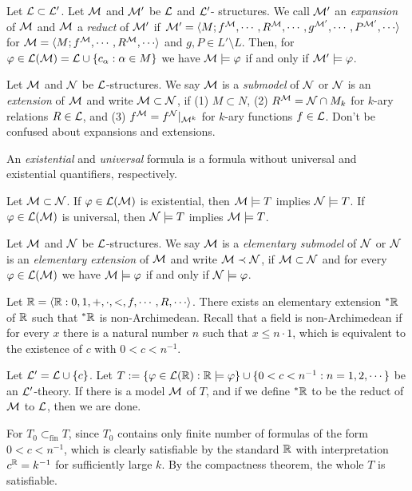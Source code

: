 \documentclass{../../../small}
\begin{document}
Let $\mathcal{L}\subset\mathcal{L}'$.
Let $\mathcal{M}$ and $\mathcal{M}'$ be $\mathcal{L}$ and $\mathcal{L}'$- structures.
We call $\mathcal{M}'$ an \emph{expansion} of $\mathcal{M}$ and $\mathcal{M}$ a \emph{reduct} of $\mathcal{M}'$ if $\cM'=\<M;f^\cM,\cdots,R^\cM,\cdots,g^{\cM'},\cdots,P^{\cM'},\cdots\>$ for $\cM=\<M;f^\cM,\cdots,R^\cM,\cdots\>$ and $g,P\in L'\setminus L$.
Then, for $\varphi\in\mathcal{L}(\mathcal{M})=\mathcal{L}\cup\{c_\alpha:\alpha\in M\}$ we have $\mathcal{M}\models\varphi$ if and only if $\mathcal{M}'\models\varphi$.

Let $\mathcal{M}$ and $\mathcal{N}$ be $\mathcal{L}$-structures.
We say $\mathcal{M}$ is a \emph{submodel} of $\mathcal{N}$ or $\mathcal{N}$ is an \emph{extension} of $\mathcal{M}$ and write $\mathcal{M}\subset\mathcal{N}$, if (1) $M\subset N$, (2) $R^{\mathcal{M}}=\mathcal{N}\cap M_k$ for $k$-ary relations $R\in\mathcal{L}$, and (3) $f^{\mathcal{M}}=f^{\mathcal{N}}|_{\mathcal{M}^k}$ for $k$-ary functions $f\in\mathcal{L}$.
Don't be confused about expansions and extensions.

\begin{defn*}
An \emph{existential} and \emph{universal} formula is a formula without universal and existential quantifiers, respectively.
\end{defn*}
\begin{prop*}
Let $\mathcal{M}\subset\mathcal{N}$.
If $\varphi\in\mathcal{L}(\mathcal{M})$ is existential, then $\mathcal{M}\models T$ implies $\mathcal{N}\models T$.
If $\varphi\in\mathcal{L}(\mathcal{M})$ is universal, then $\mathcal{N}\models T$ implies $\mathcal{M}\models T$.
\end{prop*}
\begin{defn*}
Let $\mathcal{M}$ and $\mathcal{N}$ be $\mathcal{L}$-structures.
We say $\mathcal{M}$ is a \emph{elementary submodel} of $\mathcal{N}$ or $\mathcal{N}$ is an \emph{elementary extension} of $\mathcal{M}$ and write $\mathcal{M}\prec\mathcal{N}$, if $\mathcal{M}\subset\mathcal{N}$ and for every $\varphi\in\mathcal{L}(\mathcal{M})$ we have $\mathcal{M}\models\varphi$ if and only if $\mathcal{N}\models\varphi$.
\end{defn*}
\begin{ex*}
Let $\R=\<\R:0,1,+,\cdot,<,f,\cdots,R,\cdots\>$.
There exists an elementary extension $^*\mathbb{R}$ of $\mathbb{R}$ such that $^*\mathbb{R}$ is non-Archimedean.
Recall that a field is non-Archimedean if for every $x$ there is a natural number $n$ such that $x\le n\cdot1$, which is equivalent to the existence of $c$ with $0<c<n^{-1}$.
\end{ex*}
\begin{pf}
Let $\mathcal{L}'=\mathcal{L}\cup\{c\}$.
Let $T:=\{\varphi\in\mathcal{L}(\mathbb{R}):\mathbb{R}\models\varphi\}\cup\{0<c<n^{-1}:n=1,2,\cdots\}$ be an $\mathcal{L}'$-theory.%
If there is a model $\mathcal{M}$ of $T$, and if we define $^*\mathbb{R}$ to be the reduct of $\mathcal{M}$ to $\mathcal{L}$, then we are done.

For $T_0\subset_{\mathrm{fin}}T$, since $T_0$ contains only finite number of formulas of the form $0<c<n^{-1}$, which is clearly satisfiable by the standard $\mathbb{R}$ with interpretation $c^{\mathbb{R}}=k^{-1}$ for sufficiently large $k$.
By the compactness theorem, the whole $T$ is satisfiable.
\end{pf}
\end{document}
